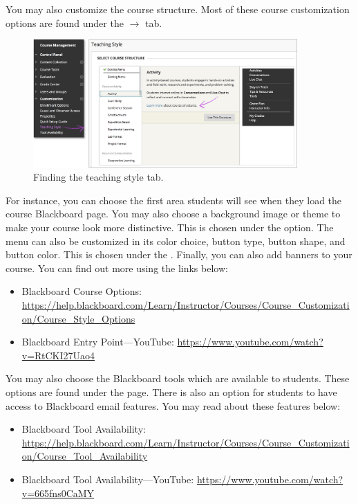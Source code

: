 You may also customize the course structure. Most of these course customization options are found under the  $\to$  tab. 

	\begin{figure}[!ht]
	\centering
	\includegraphics[width=0.9\textwidth]{sections/blackboard/images/orig_instr_course_structure_select_0}
	\caption{Finding the teaching style tab.}
	\end{figure}

For instance, you can choose the first area students will see when they load the course Blackboard page. You may also choose a background image or theme to make your course look more distinctive. This is chosen under the  option. The menu can also be customized in its color choice, button type, button shape, and button color. This is chosen under the . Finally, you can also add banners to your course. You can find out more using the links below:
	
	\begin{itemize}
	\item Blackboard Course Options: \url{https://help.blackboard.com/Learn/Instructor/Courses/Course_Customization/Course_Style_Options}
	\item Blackboard Entry Point---YouTube: \url{https://www.youtube.com/watch?v=RtCKI27Uao4}
	\end{itemize}


You may also choose the Blackboard tools which are available to students. These options are found under the  page. There is also an option for students to have access to Blackboard email features. You may read about these features below:

	\begin{itemize}
	\item Blackboard Tool Availability: \url{https://help.blackboard.com/Learn/Instructor/Courses/Course_Customization/Course_Tool_Availability}
	\item Blackboard Tool Availability---YouTube: \url{https://www.youtube.com/watch?v=665fns0CaMY}
	\end{itemize}

